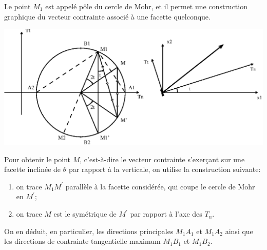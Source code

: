 Le point $M_1$ est appelé pôle du cercle de Mohr, et il permet une construction graphique du vecteur contrainte associé à une facette quelconque.
\begin{center}
    \includegraphics{../images/T1_Ch02-0018}
\end{center}
Pour obtenir le point $M$, c'est-à-dire le vecteur contrainte s'exerçant sur une facette inclinée de $\theta$ par rapport à la verticale, on utilise la construction suivante:
\begin{enumerate}
    \item on trace $M_1 M^{\prime}$ parallèle à la facette considérée, qui coupe le cercle de Mohr en $M^{\prime}$;
    \item on trace $M$ est le symétrique de $M^{\prime}$ par rapport à l'axe des $T_n$.
\end{enumerate}
On en déduit, en particulier, les directions principales $M_1 A_1$ et $M_1 A_2$ ainsi que les directions de contrainte tangentielle maximum $M_1 B_1$ et $M_1 B_2$. 

